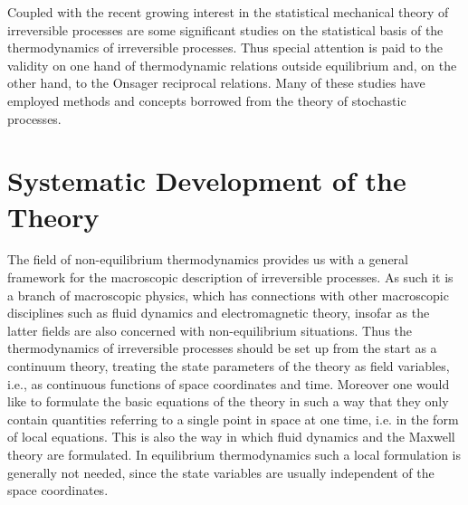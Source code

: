 Coupled with the recent growing interest in the statistical mechanical theory of irreversible processes are some significant studies on the statistical basis of the thermodynamics of irreversible processes. Thus special attention is paid to the validity on one hand of thermodynamic relations outside equilibrium and, on the other hand, to the Onsager reciprocal relations. Many of these studies have employed methods and concepts borrowed from the theory of stochastic processes.

\section{Systematic Development of the Theory}

The field of non-equilibrium thermodynamics provides us with a general framework for the macroscopic description of irreversible processes. As such it is a branch of macroscopic physics, which has connections with other macroscopic disciplines such as fluid dynamics and electromagnetic theory, insofar as the latter fields are also concerned with non-equilibrium situations. Thus the thermodynamics of irreversible processes should be set up from the start as a continuum theory, treating the state parameters of the theory as field variables, i.e., as continuous functions of space coordinates and time. Moreover one would like to formulate the basic equations of the theory in such a way that they only contain quantities referring to a single point in space at one time, i.e. in the form of local equations. This is also the way in which fluid dynamics and the Maxwell theory are formulated. In equilibrium thermodynamics such a local formulation is generally not needed, since the state variables are usually independent of the space coordinates.

